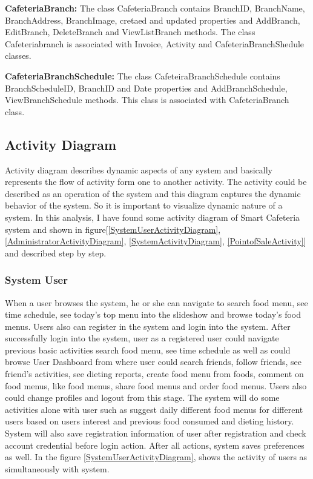 \textbf{CafeteriaBranch:} The class  CafeteriaBranch contains BranchID,
BranchName, BranchAddress, BranchImage, cretaed and updated properties and
AddBranch, EditBranch, DeleteBranch and ViewListBranch methods. The class
Cafeteriabranch is associated with Invoice, Activity and CafeteriaBranchShedule
classes.

\textbf{CafeteriaBranchSchedule:} The class CafeteiraBranchSchedule contains
BranchScheduleID, BranchID and Date properties and AddBranchSchedule,
ViewBranchSchedule methods. This class is associated with CafeteriaBranch class.


\subsection{Activity Diagram}
\label{subsec:activity}
Activity diagram \cite{UMLActivityDiagram} describes dynamic aspects of any system and
basically represents the flow of activity form one to another activity. The
activity could be described as an operation of the system and this diagram
captures the dynamic behavior of the system. So it is important to visualize
dynamic nature of a system. In this analysis, I have found some activity diagram
of Smart Cafeteria system and shown in figure[\ref{SystemUserActivityDiagram},
\ref{AdministratorActivityDiagram}, \ref{SystemActivityDiagram},
\ref{PointofSaleActivity}] and described step by step.

\subsubsection{System User} When a user browses the system, he or she can
navigate to search food menu, see time schedule, see today's top menu into the
slideshow and browse today's food menus. Users also can register in the system
and login into the system.  After successfully login into the system, user as a
registered user could navigate previous basic activities search food menu, see
time schedule as well as could browse User Dashboard from where user could
search friends, follow friends, see friend's activities, see dieting reports,
create food menu from foods, comment on food menus, like food menus, share food
menus and order food menus. Users also could change profiles and logout from
this stage.
The system will do some activities alone with user such as suggest daily
different food menus for different users based on users interest and previous
food consumed and dieting history. System will also save registration
information of user after registration and check account credential before login
action. After all actions, system saves preferences as well. In the figure
\ref{SystemUserActivityDiagram}, shows the activity of users as simultaneously
with system.

